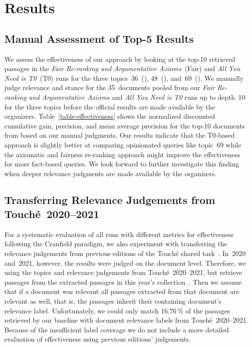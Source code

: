 \section{Results}
\label{results}


\subsection{Manual Assessment of Top-5 Results}
% 


We assess the effectiveness of our approach by looking at the top-10 retrieved passages in the \emph{Fair Re-ranking and Argumentative Axioms}~(Fair) and \emph{All You Need is T0}~(T0) runs for the three topics~36~(), 48~(), and~69~().
We manually judge relevance and stance for the 35~documents pooled from our \emph{Fair Re-ranking and Argumentative Axioms} and \emph{All You Need is T0} runs up to depth~10 for the three topics before the official results are made available by the organizers.
Table~\ref{table-effectiveness} shows the normalized discounted cumulative gain, precision, and mean average precision for the top-10 documents from based on our manual judgments.
Our results indicate that the T0-based approach is slightly better at comparing opinionated queries like topic~69 while the axiomatic and fairness re-ranking approach might improve the effectiveness for more fact-based queries.
We look forward to further investigate this finding when deeper relevance judgments are made available by the organizers.

\subsection{Transferring Relevance Judgements from Touché~2020--2021}
\label{transfer-relevance-judgements}

For a systematic evaluation of all runs with different metrics for effectiveness following the Cranfield paradigm, we also experiment with transferring the relevance judgements from previous editions of the Touché shared task~\cite{BondarenkoFBGAPBSWPH2020,BondarenkoGFBAPBSWPH2021}.
In~2020 and~2021, however, the results were judged on the document level.
Therefore, we using the topics and relevance judgements from Touché~2020--2021, but retrieve passages from the extracted passages in this year's collection~\cite{BondarenkoFKSGBPBSWPH2022}.
Then we assume that if a document was relevant all passages extracted from that document are relevant as well, that is, the passages inherit their containing document's relevance label.
Unfortunately, we could only match 16.76\,\% of the passages retrieved by our baseline with document relevance labels from Touché~2020--2021.
Because of the insufficient label coverage we do not include a more detailed evaluation of effectiveness using previous editions' judgements.
